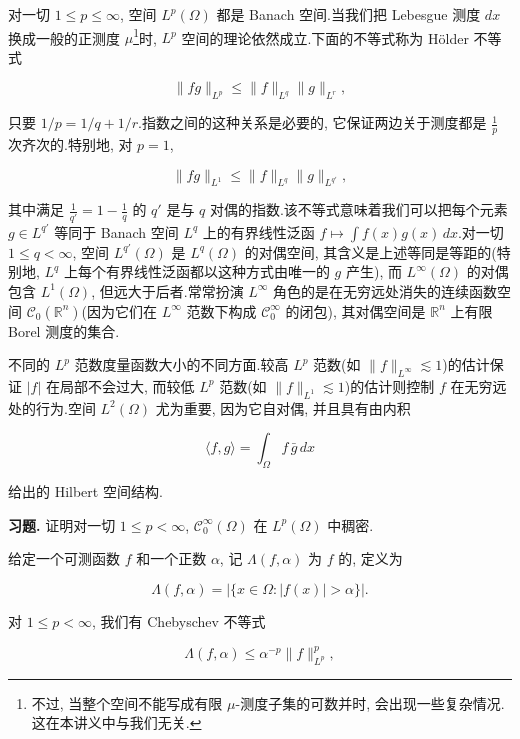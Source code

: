 对一切 $1\le p\le\infty$, 空间 $L^p(\Omega)$ 都是 Banach 空间.当我们把 Lebesgue 测度 $dx$ 换成一般的正测度 $\mu$\footnote{不过, 当整个空间不能写成有限 $\mu$-测度子集的可数并时, 会出现一些复杂情况.这在本讲义中与我们无关.}时, $L^p$ 空间的理论依然成立.下面的不等式称为 Hölder 不等式

\begin{equation}
\|fg\|_{L^p} \le \|f\|_{L^q}\|g\|_{L^r}, \label{eq:c6-179}
\end{equation}

只要 $1/p = 1/q + 1/r$.指数之间的这种关系是必要的, 它保证两边关于测度都是 $\frac{1}{p}$ 次齐次的.特别地, 对 $p=1$,

\[
\|fg\|_{L^1} \le \|f\|_{L^q}\|g\|_{L^{q'}},
\]

其中满足 $\frac{1}{q'} = 1 - \frac{1}{q}$ 的 $q'$ 是与 $q$ 对偶的指数.该不等式意味着我们可以把每个元素 $g\in L^{q'}$ 等同于 Banach 空间 $L^q$ 上的有界线性泛函 $f\mapsto\int f(x)g(x)\, dx$.对一切 $1\le q<\infty$, 空间 $L^{q'}(\Omega)$ 是 $L^q(\Omega)$ 的对偶空间, 其含义是上述等同是等距的(特别地, $L^q$ 上每个有界线性泛函都以这种方式由唯一的 $g$ 产生), 而 $L^\infty(\Omega)$ 的对偶包含 $L^1(\Omega)$, 但远大于后者.常常扮演 $L^\infty$ 角色的是在无穷远处消失的连续函数空间 $\mathcal{C}_0(\mathbb{R}^n)$(因为它们在 $L^\infty$ 范数下构成 $\mathcal{C}_0^\infty$ 的闭包), 其对偶空间是 $\mathbb{R}^n$ 上有限 Borel 测度的集合.

不同的 $L^p$ 范数度量函数大小的不同方面.较高 $L^p$ 范数(如 $\|f\|_{L^\infty}\lesssim 1$)的估计保证 $|f|$ 在局部不会过大, 而较低 $L^p$ 范数(如 $\|f\|_{L^1}\lesssim 1$)的估计则控制 $f$ 在无穷远处的行为.空间 $L^2(\Omega)$ 尤为重要, 因为它自对偶, 并且具有由内积

\[
\langle f, g\rangle = \int_\Omega f\, \bar{g}\, dx
\]

给出的 Hilbert 空间结构.

\textbf{习题.} 证明对一切 $1\le p<\infty$, $\mathcal{C}_0^\infty(\Omega)$ 在 $L^p(\Omega)$ 中稠密.

给定一个可测函数 $f$ 和一个正数 $\alpha$, 记 $\Lambda(f, \alpha)$ 为 $f$ 的, 定义为

\[
\Lambda(f, \alpha) = |\{x\in\Omega : |f(x)| > \alpha\}|.
\]

对 $1\le p<\infty$, 我们有 Chebyschev 不等式

\begin{equation}
\Lambda(f, \alpha) \le \alpha^{-p}\|f\|_{L^p}^p, \label{eq:c6-180}
\end{equation}

